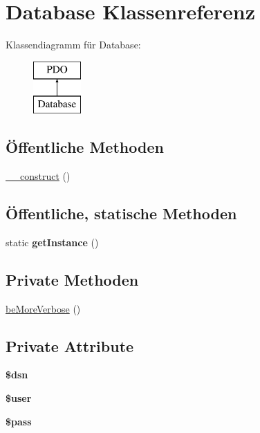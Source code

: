 \hypertarget{class_database}{\section{Database Klassenreferenz}
\label{class_database}
}
Klassendiagramm für Database\-:\begin{figure}[H]
\begin{center}
\leavevmode
\includegraphics[height=2.000000cm]{class_database}
\end{center}
\end{figure}
\subsection*{Öffentliche Methoden}
\begin{DoxyCompactItemize}
\item 
\hyperlink{class_database_a2852f635197e76a838486e64e00aac9f}{\-\_\-\-\_\-construct} ()
\end{DoxyCompactItemize}
\subsection*{Öffentliche, statische Methoden}
\begin{DoxyCompactItemize}
\item 
\hypertarget{class_database_a8399325825e893103c463e644f817f86}{static {\bfseries get\-Instance} ()}\label{class_database_a8399325825e893103c463e644f817f86}

\end{DoxyCompactItemize}
\subsection*{Private Methoden}
\begin{DoxyCompactItemize}
\item 
\hyperlink{class_database_a669fc0eb6ea0dc6bb76411e0338886c7}{be\-More\-Verbose} ()
\end{DoxyCompactItemize}
\subsection*{Private Attribute}
\begin{DoxyCompactItemize}
\item 
\hypertarget{class_database_acf4bc044b7d1c3e54536ea4f2b0da56a}{{\bfseries \$dsn}}\label{class_database_acf4bc044b7d1c3e54536ea4f2b0da56a}

\item 
\hypertarget{class_database_ae9e43fb2a274428ec75ae70be7ab045f}{{\bfseries \$user}}\label{class_database_ae9e43fb2a274428ec75ae70be7ab045f}

\item 
\hypertarget{class_database_a8783a2890064e9d86b48a55fa09432f5}{{\bfseries \$pass}}\label{class_database_a8783a2890064e9d86b48a55fa09432f5}

\end{DoxyCompactItemize}

